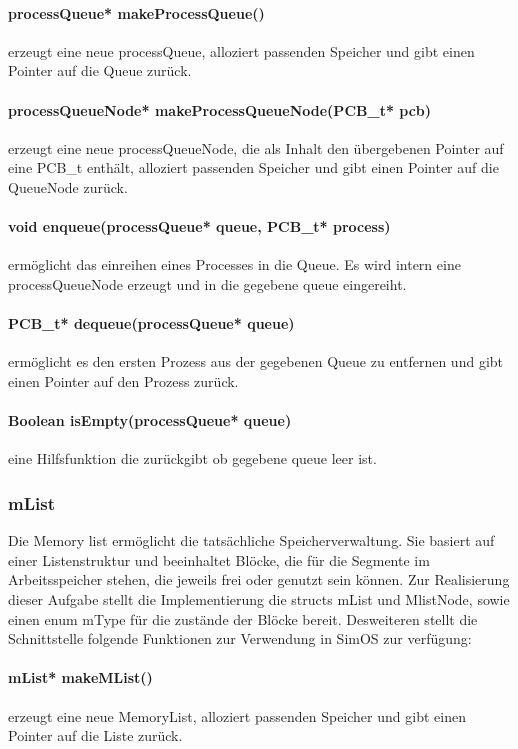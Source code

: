 \paragraph{processQueue* makeProcessQueue()} erzeugt eine neue processQueue, alloziert passenden Speicher und gibt einen Pointer auf die Queue zurück.

\paragraph{processQueueNode* makeProcessQueueNode(PCB\_t* pcb)} erzeugt eine neue processQueueNode, die als Inhalt den übergebenen Pointer auf eine PCB\_t enthält, alloziert passenden Speicher und gibt einen Pointer auf die QueueNode zurück.

\paragraph{void enqueue(processQueue* queue, PCB\_t* process)} ermöglicht das einreihen eines Processes in die Queue. Es wird intern eine processQueueNode erzeugt und in die gegebene queue eingereiht.

\paragraph{PCB\_t* dequeue(processQueue* queue)} ermöglicht es den ersten Prozess aus der gegebenen Queue zu entfernen und gibt einen Pointer auf den Prozess zurück.

\paragraph{Boolean isEmpty(processQueue* queue)} eine Hilfsfunktion die zurückgibt ob gegebene queue leer ist.


\subsubsection{mList}
Die Memory list ermöglicht die tatsächliche Speicherverwaltung. Sie basiert auf einer Listenstruktur und beeinhaltet Blöcke, die für die Segmente im Arbeitsspeicher stehen, die jeweils frei oder genutzt sein können.
Zur Realisierung dieser Aufgabe stellt die Implementierung die structs mList und MlistNode, sowie einen enum mType für die zustände der Blöcke bereit.
Desweiteren stellt die Schnittstelle folgende Funktionen zur Verwendung in SimOS zur verfügung:

\paragraph{mList* makeMList()} erzeugt eine neue MemoryList, alloziert passenden Speicher und gibt einen Pointer auf die Liste zurück.

